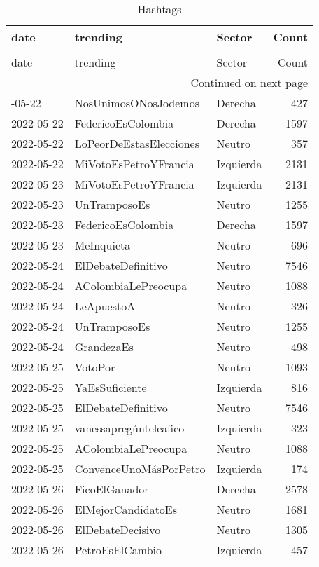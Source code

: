 \begin{longtable}{lllr}
\caption{Hashtags} \label{table:hashtags} \\
\toprule
date & trending & Sector & Count \\
\midrule
\endfirsthead
\caption[]{Hashtags} \\
\toprule
date & trending & Sector & Count \\
\midrule
\endhead
\midrule
\multicolumn{4}{r}{Continued on next page} \\
\midrule
\endfoot
\bottomrule
\endlastfoot
2022-05-22 & NosUnimosONosJodemos & Derecha & 427 \\
2022-05-22 & FedericoEsColombia & Derecha & 1597 \\
2022-05-22 & LoPeorDeEstasElecciones & Neutro & 357 \\
2022-05-22 & MiVotoEsPetroYFrancia & Izquierda & 2131 \\
2022-05-23 & MiVotoEsPetroYFrancia & Izquierda & 2131 \\
2022-05-23 & UnTramposoEs & Neutro & 1255 \\
2022-05-23 & FedericoEsColombia & Derecha & 1597 \\
2022-05-23 & MeInquieta & Neutro & 696 \\
2022-05-24 & ElDebateDefinitivo & Neutro & 7546 \\
2022-05-24 & AColombiaLePreocupa & Neutro & 1088 \\
2022-05-24 & LeApuestoA & Neutro & 326 \\
2022-05-24 & UnTramposoEs & Neutro & 1255 \\
2022-05-24 & GrandezaEs & Neutro & 498 \\
2022-05-25 & VotoPor & Neutro & 1093 \\
2022-05-25 & YaEsSuficiente & Izquierda & 816 \\
2022-05-25 & ElDebateDefinitivo & Neutro & 7546 \\
2022-05-25 & vanessapregúnteleafico & Izquierda & 323 \\
2022-05-25 & AColombiaLePreocupa & Neutro & 1088 \\
2022-05-25 & ConvenceUnoMásPorPetro & Izquierda & 174 \\
2022-05-26 & FicoElGanador & Derecha & 2578 \\
2022-05-26 & ElMejorCandidatoEs & Neutro & 1681 \\
2022-05-26 & ElDebateDecisivo & Neutro & 1305 \\
2022-05-26 & PetroEsElCambio & Izquierda & 457 \\

\end{longtable}
